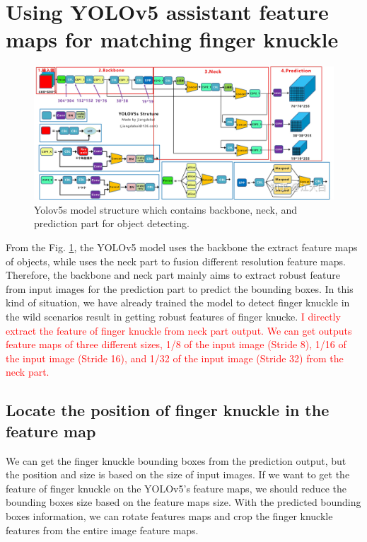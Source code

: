 
\section{Using YOLOv5 assistant feature maps for matching finger knuckle}

\begin{figure}[ht!]
    \centering
    \includegraphics[width=6in]{Figure/29-10-2022/yolov5s.jpg}
    \caption{Yolov5s model structure which contains backbone, neck, and prediction part for object detecting.}
    \label{yolov5s}
\end{figure}

From the Fig. \ref{yolov5s}, the YOLOv5 model uses the backbone the extract feature maps of objects, while uses the neck part to fusion different resolution feature maps. Therefore, the backbone and neck part mainly aims to extract robust feature from input images for the prediction part to predict the bounding boxes. In this kind of situation, we have already trained the model to detect finger knuckle in the wild scenarios result in getting robust features of finger knucke. \textcolor{red}{I directly extract the feature of finger knuckle from neck part output. We can get outputs feature maps of three different sizes, 1/8 of the input image (Stride 8), 1/16 of the input image (Stride 16), and 1/32 of the input image (Stride 32) from the neck part.}

\subsection{Locate the position of finger knuckle in the feature map}
We can get the finger knuckle bounding boxes from the prediction output, but the position and size is based on the size of input images. If we want to get the feature of finger knuckle on the YOLOv5's feature maps, we should reduce the bounding boxes size based on the feature maps size. With the predicted bounding boxes information, we can rotate features maps and crop the finger knuckle features from the entire image feature maps. 

